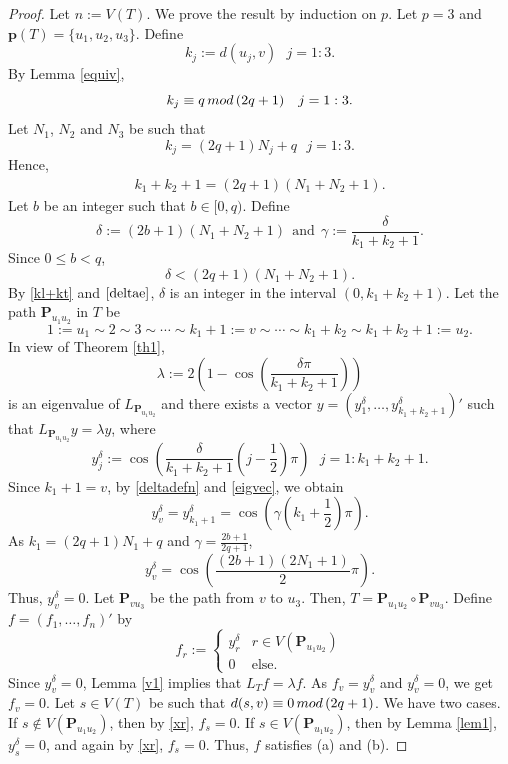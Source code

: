 \documentclass[10pt,a4paper]{amsart}
\def\pt{\mathbf{p}}
\newcommand{\p}{{\mathbf{P}}}
\begin{document}
\begin{proof}
 Let $n:=V(T)$. We prove the result by induction on $p$. Let $p=3$
and $\pt(T)=\{u_1,u_2,u_3\}$.
Define
$$k_j:=d(u_j,v)~~~j=1:3.$$
By Lemma \ref{equiv},
\[k_j\equiv q\,{\rm{mod}}\,(2q+1)~~~j=1:3.\]
Let $N_1$, $N_2$ and $N_3$ be such that
\[k_j=(2q+1)N_j+q~~~j=1:3.\]
Hence,
\begin{align} \label{kl+kt}
k_1+k_2+1=(2q+1)(N_1+N_2+1).
\end{align}
Let $b$ be an integer such that $b \in [0,q)$. Define
\begin{equation} \label{deltadefn}
\delta:=(2b+1)(N_1+N_2+1)~~\text{and}~~\gamma:=\frac{\delta}{k_1+k_2+1}. 
\end{equation}
Since $0 \leq b < q$,
\begin{equation} \label{deltae}
\delta < (2q+1) (N_1+N_2+1).
\end{equation}
By \eqref{kl+kt} and $\eqref{deltae}$,
$\delta$ is an integer in  the interval $(0,k_1 + k_2 +1)$.
Let the path $\p_{u_1u_2}$ in $T$ be
\[1:=u_1 \sim 2 \sim 3 \sim \cdots \sim k_1+1:=v \sim \cdots \sim k_1+k_2 \sim k_{1}+k_{2}+1:=u_2.\]
In view of Theorem \ref{th1}, 
\[\lambda:=2\left(1- \cos\left(\frac{{\delta \pi}}{{k_1+k_2+1}}\right)\right)\]
is an eigenvalue of $L_{\p_{u_1u_2}}$ and
there exists a vector $y=(y_1^{\delta},\dotsc,y_{k_1+k_2+1}^{\delta})'$ such that
$L_{\p_{u_1u_2}}y=\lambda y$, where 
\begin{equation}\label{eigvec}
 y_j^{\delta}:=\cos\left(\frac{\delta}{k_1+k_2+1} \left(j-\frac{1}{2} \right)\pi \right)~~~j=1:k_1+k_2+1.   
\end{equation}
 Since $k_1+1=v$, by \eqref{deltadefn} and \eqref{eigvec}, we obtain 
\[y_v^{\delta}=y_{k_1+1}^{\delta}=
        \cos \left(\gamma\left( k_1+\frac{1}{2} \right)\pi  \right).\]
As $k_1=(2q+1)N_1+q$ and $\gamma=\frac{2b+1}{2q+1}$,
       \[y_v^{\delta}= \cos \left( \frac{(2b+1)(2N_1+1)}{2}\pi \right).\]
        Thus,  $y_v^{\delta}=0$. Let $\p_{vu_3}$ be the path from $v$ to $u_3$.
        Then,
        $T=\p_{u_1u_2} \circ \p_{v u_3}$.
Define $f=(f_1,\dotsc,f_n)'$ by
\begin{equation}\label{xr}
f_r:=
\begin{cases}
y_r^{\delta} & r\in V(\p_{u_1u_2}) \\
0 & \mbox{else.}
\end{cases}    
\end{equation}
Since $y_v^\delta=0$, Lemma \ref{v1} implies that
$L_Tf=\lambda f$.
As $f_v=y_v^{\delta}$ and $y_v^{\delta}=0$, we get $f_v=0$.
Let $s \in V(T)$ be  such that $d(s,v) \equiv 0\,{\rm{mod}}\,(2q+1)$. 
We have two cases.
If $s\notin V(\p_{u_1u_2})$, then
by \eqref{xr}, $f_s=0$. If $s\in V(\p_{u_1u_2})$, then by Lemma \ref{lem1}, 
$y_s^{\delta}=0$, and again by
\eqref{xr},
\(f_s=0.\)
Thus, $f$ satisfies (a) and (b).



\end{proof}
\end{document}
